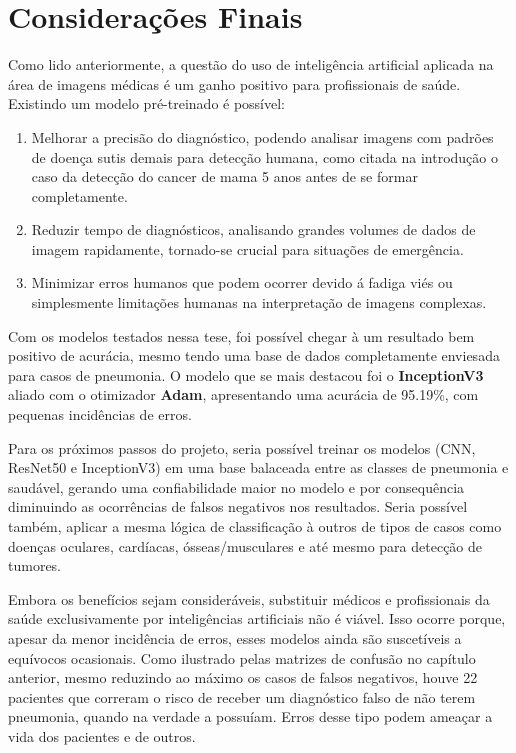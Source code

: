 \chapter{Considerações Finais}
\label{cha:Considerações Finais}

Como lido anteriormente, a questão do uso de inteligência artificial aplicada na área de imagens médicas é um ganho positivo para profissionais de saúde. Existindo um modelo pré-treinado é possível: 

\begin{enumerate}
    \item  Melhorar a precisão do diagnóstico, podendo analisar imagens com padrões de doença sutis demais para detecção humana, como citada na introdução o caso da detecção do cancer de mama 5 anos antes de se formar completamente.
    \item Reduzir tempo de diagnósticos, analisando grandes volumes de dados de imagem rapidamente, tornado-se crucial para situações de emergência.
    \item Minimizar erros humanos que podem ocorrer devido á fadiga viés ou simplesmente limitações humanas na interpretação de imagens complexas.
\end{enumerate}

Com os modelos testados nessa tese, foi possível chegar à um resultado bem positivo de acurácia, mesmo tendo uma base de dados completamente enviesada para casos de pneumonia. O modelo que se mais destacou foi o \textbf{InceptionV3} aliado com o otimizador \textbf{Adam}, apresentando uma acurácia de 95.19\%, com pequenas incidências de erros.  

Para os próximos passos do projeto, seria possível treinar os modelos (CNN, ResNet50 e InceptionV3) em uma base balaceada entre as classes de pneumonia e saudável, gerando uma confiabilidade maior no modelo e por consequência diminuindo as ocorrências de falsos negativos nos resultados. Seria possível também, aplicar a mesma lógica de classificação à outros de tipos de casos como doenças oculares, cardíacas, ósseas/musculares e até mesmo para detecção de tumores.  

Embora os benefícios sejam consideráveis, substituir médicos e profissionais da saúde exclusivamente por inteligências artificiais não é viável. Isso ocorre porque, apesar da menor incidência de erros, esses modelos ainda são suscetíveis a equívocos ocasionais. Como ilustrado pelas matrizes de confusão no capítulo anterior, mesmo reduzindo ao máximo os casos de falsos negativos, houve 22 pacientes que correram o risco de receber um diagnóstico falso de não terem pneumonia, quando na verdade a possuíam. Erros desse tipo podem ameaçar a vida dos pacientes e de outros.

